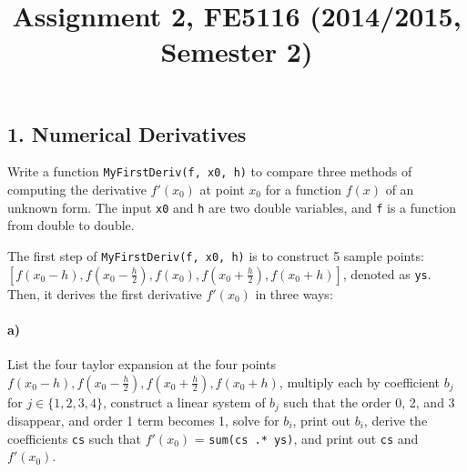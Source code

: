 \documentclass[12pt,a4paper,hidelinks,fleqn]{article}            %
\title{\vspace{-5ex}Assignment 2, FE5116 (2014/2015, Semester 2)\vspace{-7ex}}
\date{}
\begin{document}
\maketitle

\subsection*{1. Numerical Derivatives}
Write a function \verb=MyFirstDeriv(f, x0, h)= to compare three methods of computing the derivative $f'(x_0)$
at point $x_0$ for a function $f(x)$ of an unknown form.
The input \verb=x0= and \verb=h= are two double variables,
and \verb=f= is a function from double to double. 

The first step of \verb=MyFirstDeriv(f, x0, h)= is to construct 5 sample points: $[f(x_0-h), f(x_0-\frac{h}{2}), f(x_0), f(x_0+\frac{h}{2}), f(x_0+h)]$, denoted as \verb=ys=.
Then, it derives the first derivative $f'(x_0)$ in three ways:

\vspace{-6mm}
\paragraph{a)} List the four taylor expansion at the four points $f(x_0-h), f(x_0-\frac{h}{2}), f(x_0+\frac{h}{2}), f(x_0+h)$, 
multiply each by coefficient $b_j$ for $j\in\{1, 2, 3, 4\}$, 
construct a linear system of $b_j$ such that the order 0, 2, and 3 disappear, and order 1 term becomes 1, 
solve for $b_i$, 
print out $b_i$,
derive the coefficients \verb=cs= such that $f'(x_0)$ = \verb=sum(cs .* ys)=,
and print out \verb=cs= and $f'(x_0)$. 
\vspace{-6mm}
\end{document}
